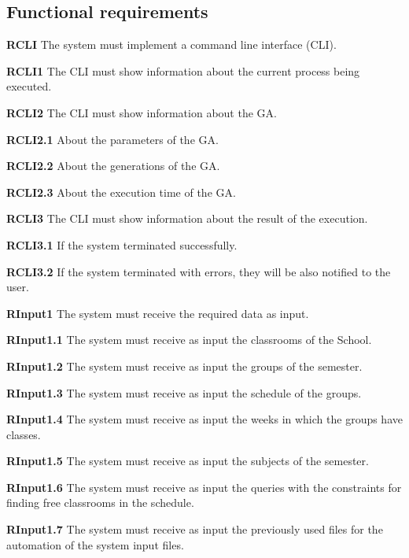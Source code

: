 \subsection{Functional requirements}

\begin{description}

    \item \textbf{RCLI} The system must implement a command line interface (CLI).
        \begin{description}
            \item \textbf{RCLI1} The CLI must show information about the current process being executed.
            \item \textbf{RCLI2} The CLI must show information about the GA.
                \begin{description}
                    \item \textbf{RCLI2.1} About the parameters of the GA.
                    \item \textbf{RCLI2.2} About the generations of the GA.
                    \item \textbf{RCLI2.3} About the execution time of the GA.
                \end{description}
            \item \textbf{RCLI3} The CLI must show information about the result of the execution.
                \begin{description}
                    \item \textbf{RCLI3.1} If the system terminated successfully.
                    \item \textbf{RCLI3.2} If the system terminated with errors, they will be also notified to the user.
                \end{description}
        \end{description}

    \item \textbf{RInput1} The system must receive the required data as input.
        \begin{description}
            \item \textbf{RInput1.1} The system must receive as input the classrooms of the School.
            \item \textbf{RInput1.2} The system must receive as input the groups of the semester.
            \item \textbf{RInput1.3} The system must receive as input the schedule of the groups.
            \item \textbf{RInput1.4} The system must receive as input the weeks in which the groups have classes.
            \item \textbf{RInput1.5} The system must receive as input the subjects of the semester.
            \item \textbf{RInput1.6} The system must receive as input the queries with the constraints for finding free classrooms in the schedule.
            \item \textbf{RInput1.7} The system must receive as input the previously used files for the automation of the system input files.
        \end{description}


\end{description}

